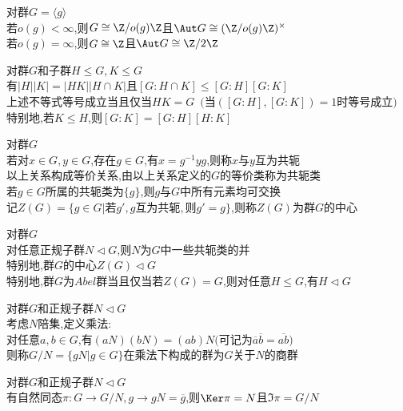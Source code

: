 \begin{dingli}
对群$G=\langle g\rangle$\\
若$o(g)<\infty$,则$G\cong \Z/o(g)\Z$且$\Aut G\cong(\Z/o(g)\Z)^{\times}$\\
若$o(g)=\infty$,则$G\cong \Z$且$\Aut G\cong \Z/2\Z$
\end{dingli}

\begin{dingli}
对群$G$和子群$H\leq G,K\leq G$\\
有$|H||K|=|HK||H\cap K|$且$[G:H\cap K]\leq [G:H][G:K]$\\
上述不等式等号成立当且仅当$HK=G$\ $($当$([G:H],[G:K])=1$时等号成立$)$\\
特别地,若$K\leq H$,则$[G:K]=[G:H][H:K]$
\end{dingli}

\begin{dingyi}
对群$G$\\
若对$x\in G,y\in G$,存在$g\in G$,有$x=g^{-1}yg$,则称$x$与$y$互为共轭\\
以上关系构成等价关系,由以上关系定义的$G$的等价类称为共轭类\\
若$g\in G$所属的共轭类为$\{g\}$,则$g$与$G$中所有元素均可交换\\
记$Z(G)=\{g\in G|\text{若}g',g\text{互为共轭},\text{则}g'=g\}$,则称$Z(G)$为群$G$的中心
\end{dingyi}

\begin{tuilun}
对群$G$\\
对任意正规子群$N\lhd G$,则$N$为$G$中一些共轭类的并\\
特别地,群$G$的中心$Z(G)\lhd G$\\
特别地,群$G$为$Abel$群当且仅当若$Z(G)=G$,则对任意$H\leq G$,有$H\lhd G$
\end{tuilun}

\begin{dingyi}
对群$G$和正规子群$N\lhd G$\\
考虑$N$陪集,定义乘法:\\
对任意$a,b\in G$,有$(aN)(bN)=(ab)N$$($可记为$\overline{a}\overline{b}=\overline{ab}$$)$\\
则称$G/N=\{gN|g\in G\}$在乘法下构成的群为$G$关于$N$的商群
\end{dingyi}

\begin{tuilun}
对群$G$和正规子群$N\lhd G$\\
有自然同态$\pi:G\to G/N,g\to gN=\overline{g}$,则$\Ker \pi=N$且$\Im \pi=G/N$
\end{tuilun}

